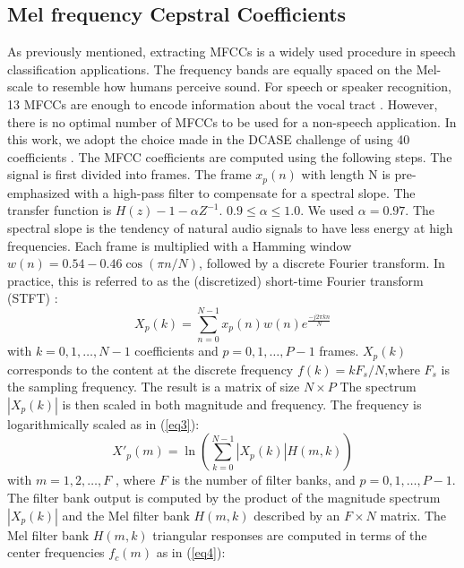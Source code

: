 \documentclass{ieeeaccess}
\begin{document}
\subsection{Mel frequency Cepstral Coefficients}
As previously mentioned, extracting MFCCs is a widely used procedure in speech classification applications. The frequency bands are equally spaced on the Mel-scale to resemble how humans perceive sound. For speech or speaker recognition, 13 MFCCs are enough to encode information about the vocal tract \cite{24}. However, there is no optimal number of MFCCs to be used for a non-speech application. In this work, we adopt the choice made in the DCASE challenge of using 40 coefficients \cite{25}. The MFCC coefficients are computed using the following steps. The signal is first divided into frames. The frame  $x_{p}(n)$ with length N is pre-emphasized with a high-pass filter to compensate for a spectral slope. The transfer function is $ H(z)-1-\alpha Z^{-1} $. $0.9\leq\alpha\leq1.0$. We used $\alpha =0.97$. The spectral slope is the tendency of natural audio signals to have less energy at high frequencies. Each frame is multiplied with a Hamming window  $ w(n)=0.54-0.46\cos (\pi n/N) $, followed by a discrete Fourier transform. In practice, this is referred to as the (discretized) short-time Fourier transform (STFT)  \cite{26}: 
\begin{equation}
X_{p}(k)=\sum_{n=0}^{N-1}x_{p}(n)w(n)e^\frac{-j2\pi kn}{N}
\label{eq2}\end{equation}
with $k=0,1, … ,N-1$ coefficients and $p=0,1, … , P-1$ frames. $ X_{p}(k) $  corresponds to the content at the discrete frequency $ f(k)=kF_{s}/N $,where  $F_{s}$  is the sampling frequency. The result is a matrix of size $ N\times P$  The spectrum $ \left | X_{p}(k)\right | $ is then scaled in both magnitude and frequency. The frequency is logarithmically scaled as in (\ref{eq3}): 
\begin{equation}
{X}'_{p}(m)=\ln\left (\sum_{k=0}^{N-1}\left | X_{p}(k) \right | H(m,k)\right )
\label{eq3}
\end{equation}
with $m = 1, 2, … , F$ , where $F$ is the number of filter banks, and  $p = 0,1, … , P-1$. The filter bank output is computed by the product of the magnitude spectrum $ \left | X_{p}(k) \right |$ and the Mel filter bank $H(m,k) $ described by an  $F\times N$ matrix. The Mel filter bank $H(m,k)$ triangular responses are computed in terms of the center frequencies $f_{c}(m)$ as in (\ref{eq4}):
\end{document}
